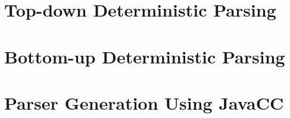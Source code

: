 \documentclass[8pt,a4paper,compress]{beamer}
\begin{document}
\section{Top-down Deterministic Parsing}
\begin{frame}[fragile]
\pause

\end{frame}

\section{Bottom-up Deterministic Parsing}
\begin{frame}[fragile]
\pause

\end{frame}

\section{Parser Generation Using JavaCC}
\begin{frame}[fragile]
\pause

\end{frame}
\end{document}
